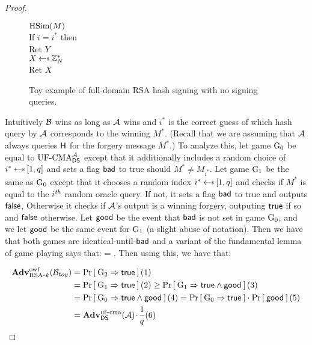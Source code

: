 \begin{proof}
\begin{figure}
{\underline{$\textnormal{HSim}(M)$}\\
If $i = i^*$ then\\
\myInd Ret $Y$\\
$X \getsr \Z_N^*$\\
Ret $X$
}
  \caption{Toy example of full-domain RSA hash signing with no signing queries.}
\label{fig:fulldomaintoy}
\end{figure}


Intuitively ${\mathcal B}$ wins as long as ${\mathcal A}$ wins and $i^*$ is the correct guess
of which hash query by ${\mathcal A}$ corresponds to the winning $M^*$. (Recall that we
are assuming that ${\mathcal A}$ always queries $\mathsf{H}$ for the forgery message
$M^*$.) To analyze this, let game ${{\textnormal G}}_0$ be equal to $\textnormal{UF-CMA}_{{\mathsf{DS}}}^{\mathcal A}$ except
that it additionally includes a random choice of $i^* \getsr [1,q]$ and sets a
flag $\mathsf{bad}$ to true should $M^* \ne M_{i^*}$. Let
game ${{\textnormal G}}_1$ be the same as ${{\textnormal G}}_0$ except that  it chooses a random index $i^*
\getsr [1,q]$ and checks if $M^*$ is equal to the $i^{\textit{th}}$ random oracle
query. If not, it sets a flag $\mathsf{bad}$ to true and outputs $\mathsf{false}$, 
Otherwise it checks if ${\mathcal A}$'s output is a winning forgery, outputing
$\mathsf{true}$ if so and $\mathsf{false}$ otherwise. Let $\mathsf{good}$ be the event that $\mathsf{bad}$ is
not set in game ${{\textnormal G}}_0$, and we let $\mathsf{good}$ be the same event for ${{\textnormal G}}_1$ (a
slight abuse of notation). Then we have that both games are
identical-until-$\mathsf{bad}$ and a variant of the fundamental lemma of game playing
says that:
\bnm
  \Prob{\G_0 \Rightarrow\true \land\good} = \Prob{\G_1\Rightarrow\true \land
  \good} \;.
\enm
Then using this, we have that:
\iffalse
\begin{align*}
\AdvOWF{\RSAk}{\advB_{toy}} 
  &\ge \Prob{\G_0\Rightarrow\true\land\good} (2)\\
  &= \Prob{\G_1\Rightarrow\true\land\good} (3)\\
  &= \Prob{\G_1\Rightarrow\true}\cdot\Prob{\good} (4)\\
  &= \AdvUFCMA{\DS}{\advA}\cdotsm\frac{1}{q_h} (5)
\end{align*}
\fi

\begin{align*}
\mathbf{Adv}^{\mathrm{owf}}_{{\textnormal{RSA}\mbox{-} k}}({\mathcal B}_{toy}) 
  &= \Pr\left[\: {{\textnormal G}}_2\Rightarrow\mathsf{true} \:\right] (1) \\
  &= \Pr\left[\: {{\textnormal G}}_1\Rightarrow\mathsf{true} \:\right] (2)
  \ge \Pr\left[\: {{\textnormal G}}_1\Rightarrow\mathsf{true}\land\mathsf{good} \:\right] (3)\\
  &= \Pr\left[\: {{\textnormal G}}_0\Rightarrow\mathsf{true}\land\mathsf{good} \:\right] (4)
  = \Pr\left[\: {{\textnormal G}}_0\Rightarrow\mathsf{true} \:\right]\cdot\Pr\left[\: \mathsf{good} \:\right] (5)\\
  &= \mathbf{Adv}^{\mathrm{uf\mbox{-} cma}}_{{\mathsf{DS}}}({\mathcal A}){\hspace{-0.1ex}}{\hspace{-0.1ex}}{\hspace{-0.1ex}}\cdot{\hspace{-0.1ex}}{\hspace{-0.1ex}}{\hspace{-0.1ex}}\frac{1}{q} (6)
\end{align*}



\end{proof}
